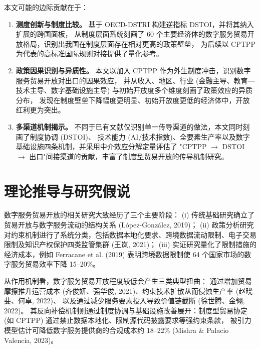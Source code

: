 \documentclass[11pt,a4paper]{article}
\begin{document}
本文可能的边际贡献在于：

\begin{enumerate}[label=(\arabic*),leftmargin=2.5em]
\item \textbf{测度创新与制度比较。} 基于 OECD-DSTRI 构建逆指标 DSTOI，并将其纳入扩展的跨国面板，
从制度层面系统刻画了 60 个主要经济体的数字服务贸易开放格局，识别出我国在制度层面存在相对更高的政策壁垒，
为后续以 CPTPP 为代表的高标准国际规则对接提供了量化参考。

\item \textbf{政策因果识别与异质性。} 本文以加入 CPTPP 作为外生制度冲击，识别数字服务贸易开放对出口的因果效应，
并从收入、地区、行业 (金融主导、教育—技术主导、数字基础设施主导) 与初始开放度多个维度刻画了政策效应的异质分布，
发现在制度壁垒下降幅度更明显、初始开放度更低的经济体中，开放红利更为突出。

\item \textbf{多渠道机制揭示。} 不同于已有文献仅识别单一传导渠道的做法，本文同时刻画了制度协调 (DSTOI)、
技术能力 (AI/技术指数)、全要素生产率以及数字基础设施四条机制，并采用中介效应分解定量评估了
"CPTPP $\to$ DSTOI $\to$ 出口"间接渠道的贡献，丰富了制度型贸易开放的传导机制研究。
\end{enumerate}

\section{理论推导与研究假说}

数字服务贸易开放的相关研究大致经历了三个主要阶段：
(i) 传统基础研究确立了贸易开放与数字服务流动的结构关系 (López-González, 2019)；
(ii) 政策分析研究对约束机制进行了系统分类，包括数据本地化要求、跨境数据流动限制、电子交易限制及知识产权保护四类监管集群 (王岚, 2021)；
(iii) 实证研究量化了限制措施的经济成本，例如 Ferracane et al. (2019) 表明跨境数据限制使 64 个国家市场的数字服务贸易效率下降 15--20\%。

从作用机制看，数字服务贸易开放程度较低会产生三类典型扭曲：
通过增加贸易摩擦推升运营成本 (齐俊妍、强华俊, 2021)、约束技术扩散从而侵蚀生产率 (赵晓斐、何卓, 2022)、
以及通过减少服务要素投入导致价值链截断 (徐世腾、金翎, 2022)。
其反向补偿机制则通过制度协调与基础设施改善展开：制度型贸易协定 (如 CPTPP) 通过禁止数据本地化、限制源代码披露要求等强约束条款，
被引力模型估计可降低数字服务提供商的合规成本约 18--22\% (Mishra \& Palacio Valencia, 2023)。
\end{document}
